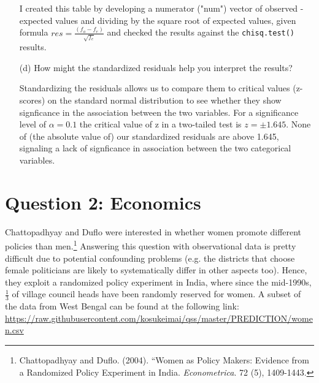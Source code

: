 \documentclass[12pt,letterpaper]{article}
\begin{document}
\begin{enumerate}
\begin{table}[h]
\begin{tabular}{l | c c c }
		\end{tabular}
	\end{table}
	\vspace{.1cm}
	
	I created this table by developing a numerator ("num") vector of observed - expected values and dividing by the square root of expected values, given formula  \(res=\frac{(f_{o}-f_{e})}{\sqrt{f_{e}}}\) and checked the results against the \texttt{chisq.test()} results.
		  
	
	\vspace{.1cm}
	\item [(d)] How might the standardized residuals help you interpret the results? \\
	\vspace{.1cm}
	
	Standardizing the residuals allows us to compare them to critical values (z-scores) on the standard normal distribution to see whether they show signficance in the association between the two variables. For a significance level of  $\alpha = 0.1$ the critical value of z in a two-tailed test is $z = \pm 1.645$. None of (the absolute value of) our standardized residuals are above 1.645, signaling a lack of signficance in association between the two categorical variables.\\
	
\end{enumerate}

\newpage

\section*{Question 2: Economics}
Chattopadhyay and Duflo were interested in whether women promote different policies than men.\footnote{Chattopadhyay and Duflo. (2004). ``Women as Policy Makers: Evidence from a Randomized Policy Experiment in India. \textit{Econometrica}. 72 (5), 1409-1443.} Answering this question with observational data is pretty difficult due to potential confounding problems (e.g. the districts that choose female politicians are likely to systematically differ in other aspects too). Hence, they exploit a randomized policy experiment in India, where since the mid-1990s, $\frac{1}{3}$ of village council heads have been randomly reserved for women. A subset of the data from West Bengal can be found at the following link: \url{https://raw.githubusercontent.com/kosukeimai/qss/master/PREDICTION/women.csv}\\
\end{document}
